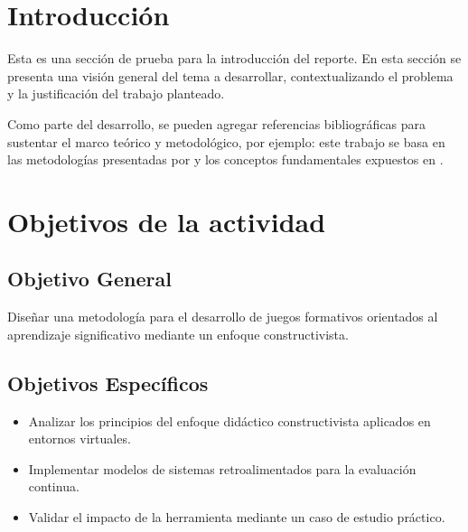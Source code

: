 \documentclass[12pt,letterpaper]{article}
\begin{document}
\newpage
{} %

\tableofcontents %
\newpage

\listoffigures %
\newpage


\section{Introducción}
Esta es una sección de prueba para la introducción del reporte. En esta sección se presenta una visión general del tema a desarrollar, contextualizando el problema y la justificación del trabajo planteado.

Como parte del desarrollo, se pueden agregar referencias bibliográficas para sustentar el marco teórico y metodológico, por ejemplo: este trabajo se basa en las metodologías presentadas por \cite{mendoza2021} y los conceptos fundamentales expuestos en \cite{smith2020}.

\section{Objetivos de la actividad}
\subsection{Objetivo General}
Diseñar una metodología para el desarrollo de juegos formativos orientados al aprendizaje significativo mediante un enfoque constructivista.

\subsection{Objetivos Específicos}
\begin{itemize}
    \item Analizar los principios del enfoque didáctico constructivista aplicados en entornos virtuales.
    \item Implementar modelos de sistemas retroalimentados para la evaluación continua.
    \item Validar el impacto de la herramienta mediante un caso de estudio práctico.
\end{itemize}
\end{document}
